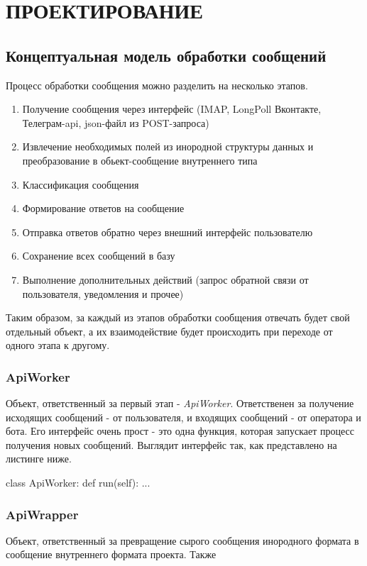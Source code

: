 \section{ПРОЕКТИРОВАНИЕ}
    \subsection{Концептуальная модель обработки сообщений}
    Процесс обработки сообщения можно разделить на несколько этапов.
    \begin{enumerate}
        \item Получение сообщения через интерфейс (IMAP, LongPoll Вконтакте, Телеграм-api, json-файл из POST-запроса)
        \item Извлечение необходимых полей из инородной структуры данных и преобразование в обьект-сообщение внутреннего типа
        \item Классификация сообщения
        \item Формирование ответов на сообщение
        \item Отправка ответов обратно через внешний интерфейс пользователю
        \item Сохранение всех сообщений в базу
        \item Выполнение дополнительных действий (запрос обратной связи от пользователя, уведомления и прочее)
    \end{enumerate}

    Таким образом, за каждый из этапов обработки сообщения отвечать будет свой отдельный объект,
    а их взаимодействие будет происходить при переходе от одного этапа к другому.
    
    \subsubsection{ApiWorker}
    Объект, ответственный за первый этап - \textit{ApiWorker}. Ответственен за получение
    исходящих сообщений - от пользователя, и входящих сообщений - от оператора и бота.
    Его интерфейс очень прост - это одна функция, которая запускает процесс получения новых сообщений.
    Выглядит интерфейс так, как представлено на листинге ниже.
    \begin{lstligting}[language=Python]
        class ApiWorker:
            def run(self):
                ...
    \end{lstligting}

    \subsubsection{ApiWrapper}
    Объект, ответственный за превращение сырого сообщения инородного формата в сообщение
    внутреннего формата проекта. Также 

